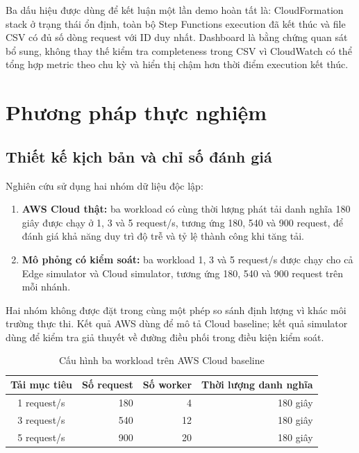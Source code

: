 Ba dấu hiệu được dùng để kết luận một lần demo hoàn tất là: CloudFormation stack ở
trạng thái ổn định, toàn bộ Step Functions execution đã kết thúc và file CSV có đủ
số dòng request với ID duy nhất. Dashboard là bằng chứng quan sát bổ sung, không
thay thế kiểm tra completeness trong CSV vì CloudWatch có thể tổng hợp metric theo
chu kỳ và hiển thị chậm hơn thời điểm execution kết thúc.


\section{Phương pháp thực nghiệm}

\subsection{Thiết kế kịch bản và chỉ số đánh giá}

Nghiên cứu sử dụng hai nhóm dữ liệu độc lập:

\begin{enumerate}
    \item \textbf{AWS Cloud thật:} ba workload có cùng thời lượng phát tải danh
    nghĩa 180 giây được chạy ở 1, 3 và 5 request/s, tương ứng 180, 540 và 900
    request, để đánh giá khả năng duy trì độ trễ và tỷ lệ thành công khi tăng tải.
    \item \textbf{Mô phỏng có kiểm soát:} ba workload 1, 3 và 5 request/s được
    chạy cho cả Edge simulator và Cloud simulator, tương ứng 180, 540 và 900
    request trên mỗi nhánh.
\end{enumerate}

Hai nhóm không được đặt trong cùng một phép so sánh định lượng vì khác môi trường
thực thi. Kết quả AWS dùng để mô tả Cloud baseline; kết quả simulator dùng để kiểm
tra giả thuyết về đường điều phối trong điều kiện kiểm soát.

\begin{table}[htbp]
    \centering
    \caption{Cấu hình ba workload trên AWS Cloud baseline}
    \label{tab:aws-load-config}
    \begin{tabular}{|c|r|r|r|}
        \hline
        \textbf{Tải mục tiêu} & \textbf{Số request} & \textbf{Số worker}
        & \textbf{Thời lượng danh nghĩa} \\ \hline
        1 request/s & 180 & 4 & 180 giây \\ \hline
        3 request/s & 540 & 12 & 180 giây \\ \hline
        5 request/s & 900 & 20 & 180 giây \\ \hline
    \end{tabular}
\end{table}

